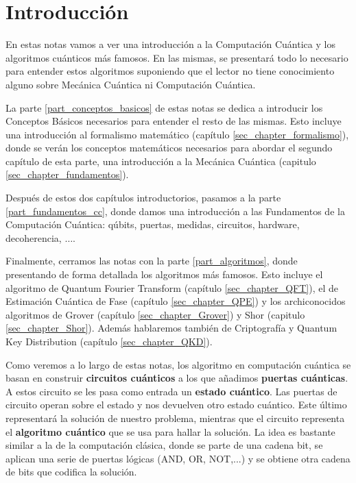 \documentclass[a4paper,11pt]{book} %
\numberwithin{equation}{chapter}
\begin{document}
\chapter*{Introducción}

En estas notas vamos a ver una introducción a la Computación Cuántica y los algoritmos cuánticos más famosos. En las mismas, se presentará todo lo necesario para entender estos algoritmos suponiendo que el lector no tiene conocimiento alguno sobre Mecánica Cuántica ni Computación Cuántica. 

La parte \ref{part_conceptos_basicos} de estas notas se dedica a introducir los Conceptos Básicos necesarios para entender el resto de las mismas. Esto incluye una introducción al formalismo matemático (capítulo \ref{sec_chapter_formalismo}), donde se verán los conceptos matemáticos necesarios para abordar el segundo capítulo de esta parte, una introducción a la Mecánica Cuántica (capitulo \ref{sec_chapter_fundamentos}). 


Después de estos dos capítulos introductorios, pasamos a la parte \ref{part_fundamentos_cc}, donde damos una introducción a las Fundamentos de la Computación Cuántica: qúbits, puertas, medidas, circuitos, hardware, decoherencia, $\dots$.


Finalmente, cerramos las notas con la parte \ref{part_algoritmos}, donde presentando de forma detallada los algoritmos más famosos. Esto incluye el algoritmo de Quantum Fourier Transform (capítulo \ref{sec_chapter_QFT}), el de Estimación Cuántica de Fase (capítulo \ref{sec_chapter_QPE}) y los archiconocidos algoritmos de Grover (capítulo \ref{sec_chapter_Grover}) y Shor (capitulo \ref{sec_chapter_Shor}). Además hablaremos también de Criptografía y Quantum Key Distribution (capítulo \ref{sec_chapter_QKD}). 

Como veremos a lo largo de estas notas, los algoritmo en computación cuántica se basan en construir \textbf{circuitos cuánticos} a los que añadimos \textbf{puertas cuánticas}. A estos circuito se les pasa como entrada un \textbf{estado cuántico}. Las puertas de circuito operan sobre el estado y nos devuelven otro estado cuántico. Este último representará la solución de nuestro problema, mientras que el circuito representa el \textbf{algoritmo cuántico} que se usa para hallar la solución. La idea es bastante similar a la de la computación clásica, donde se parte de una cadena bit, se aplican una serie de puertas lógicas (AND, OR, NOT,...) y se obtiene otra cadena de bits que codifica la solución. 
\end{document}
